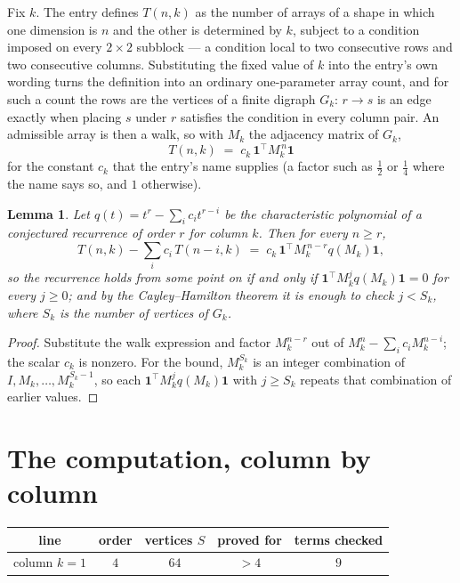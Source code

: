 \documentclass[11pt,a4paper]{article}
\theoremstyle{plain}
\newtheorem{lemma}[theorem]{Lemma}
\theoremstyle{definition}
\begin{document}
Fix $k$. The entry defines $T(n,k)$ as the number of arrays of a shape in which one dimension
is $n$ and the other is determined by $k$, subject to a condition imposed on every
$2\times2$ subblock --- a condition local to two consecutive rows and two consecutive columns.
Substituting the fixed value of $k$ into the entry's own wording turns the definition into an
ordinary one-parameter array count, and for such a count the rows are the vertices of a finite
digraph $G_k$: $r\to s$ is an edge exactly when placing $s$ under $r$ satisfies the condition
in every column pair. An admissible array is then a walk, so with $M_k$ the adjacency matrix
of $G_k$,
\[
T(n,k)\;=\;c_k\,\mathbf{1}^{\!\top}M_k^{\,n}\mathbf{1}
\]
for the constant $c_k$ that the entry's name supplies (a factor such as $\tfrac12$ or
$\tfrac14$ where the name says so, and $1$ otherwise).

\begin{lemma}\label{lem:crit}
Let $q(t)=t^{r}-\sum_i c_it^{r-i}$ be the characteristic polynomial of a conjectured
recurrence of order $r$ for column $k$. Then for every $n\ge r$,
\[
T(n,k)-\sum_i c_i\,T(n-i,k)\;=\;c_k\,\mathbf{1}^{\!\top}M_k^{\,n-r}q(M_k)\mathbf{1},
\]
so the recurrence holds from some point on if and only if
$\mathbf{1}^{\!\top}M_k^{j}q(M_k)\mathbf{1}=0$ for every $j\ge0$; and by the
Cayley--Hamilton theorem it is enough to check $j<S_k$, where $S_k$ is the number of vertices
of $G_k$.
\end{lemma}

\begin{proof}
Substitute the walk expression and factor $M_k^{n-r}$ out of $M_k^{n}-\sum_ic_iM_k^{n-i}$;
the scalar $c_k$ is nonzero. For the bound, $M_k^{S_k}$ is an integer combination of
$I,M_k,\dots,M_k^{S_k-1}$, so each $\mathbf{1}^{\!\top}M_k^{j}q(M_k)\mathbf{1}$ with
$j\ge S_k$ repeats that combination of earlier values.
\end{proof}

\section{The computation, column by column}

\begin{center}
\begin{tabular}{ccccc}
line & order & vertices $S$ & proved for & terms checked \\ \hline
column $k$$=1$ & $4$ & $64$ & $>4$ & $9$ \\
\end{tabular}
\end{center}
\end{document}
